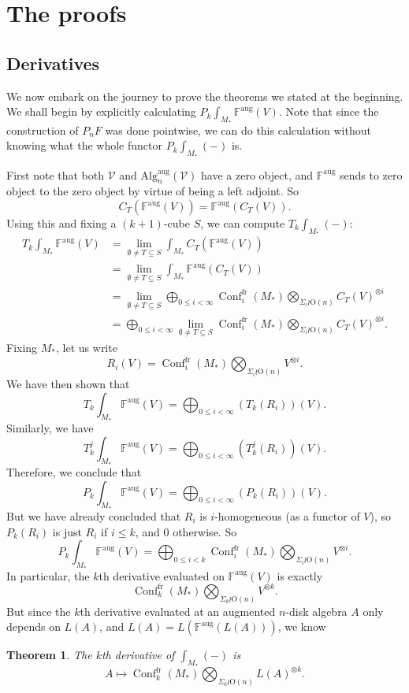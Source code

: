 \documentclass{shortart}
\newtheorem{thm}[lemma]{Theorem}
\theoremstyle{definition}
\DeclareMathOperator\Conf{Conf}
\newcommand\Algn{\mathrm{Alg}_n^{\mathrm{aug}}(\mathcal{V})}
\newcommand\lims{\lim_{\emptyset \neq T \subseteq S}}
\newcommand\F{\mathbb{F}^{\mathrm{aug}}}
\newcommand\fr{{\mathrm{fr}}}
\renewcommand\O{\mathrm{O}}
\begin{document}
\section{The proofs}
\subsection{Derivatives}
We now embark on the journey to prove the theorems we stated at the beginning. We shall begin by explicitly calculating $P_k \int_{M_*} \F(V)$. Note that since the construction of $P_n F$ was done pointwise, we can do this calculation without knowing what the whole functor $P_k \int_{M_*} (-)$ is.

First note that both $\mathcal{V}$ and $\Algn$ have a zero object, and $\F$ sends to zero object to the zero object by virtue of being a left adjoint. So
\[
  C_T(\F(V)) = \F(C_T(V)).
\]
Using this and fixing a $(k + 1)$-cube $S$, we can compute $T_k \int_{M_*}(-)$:
\[
  \begin{aligned}
    T_k \int_{M_*}\F(V) &= \lims \int_{M_*} C_T(\F(V)) \\
    &= \lims \int_{M_*} \F(C_T(V)) \\
    &= \lims \bigoplus_{0 \leq i < \infty} \Conf_i^{\fr}(M_*) \bigotimes_{\Sigma_i \wr \O(n)} C_T(V)^{\otimes i}\\
    &= \bigoplus_{0 \leq i < \infty} \lims \Conf_i^{\fr}(M_*) \bigotimes_{\Sigma_i \wr \O(n)} C_T(V)^{\otimes i}.
  \end{aligned}
\]
Fixing $M_*$, let us write
\[
  R_i(V) = \Conf_i^{\fr}(M_*) \bigotimes_{\Sigma_i \wr \O(n)} V^{\otimes i}.
\]
We have then shown that
\[
  T_k \int_{M_*} \F(V) = \bigoplus_{0 \leq i < \infty} (T_k(R_i))(V).
\]
Similarly, we have
\[
  T_k^j \int_{M_*} \F(V) = \bigoplus_{0 \leq i < \infty} (T_k^j(R_i))(V).
\]
Therefore, we conclude that
\[
  P_k \int_{M_*}\F(V) = \bigoplus_{0 \leq i < \infty} (P_k(R_i)) (V).
\]
But we have already concluded that $R_i$ is $i$-homogeneous (as a functor of $V$), so $P_k(R_i)$ is just $R_i$ if $i \leq k$, and $0$ otherwise. So
\[
  P_k \int_{M_*}\F(V) = \bigoplus_{0 \leq i < k} \Conf_i^{\fr}(M_*) \bigotimes_{\Sigma_i \wr \O(n)} V^{\otimes i}.
\]
In particular, the $k$th derivative evaluated on $\F(V)$ is exactly
\[
  \Conf_k^{\fr}(M_*) \bigotimes_{\Sigma_k \wr \O(n)} V^{\otimes k}.
\]
But since the $k$th derivative evaluated at an augmented $n$-disk algebra $A$ only depends on $L(A)$, and $L(A) = L(\F(L(A)))$, we know

\begin{thm}
  The $k$th derivative of $\int_{M_*}(-)$ is
  \[
    A \mapsto \Conf_k^{\fr}(M_*) \bigotimes_{\Sigma_k \wr \O(n)} L(A)^{\otimes k}.
  \]
\end{thm}
\end{document}
